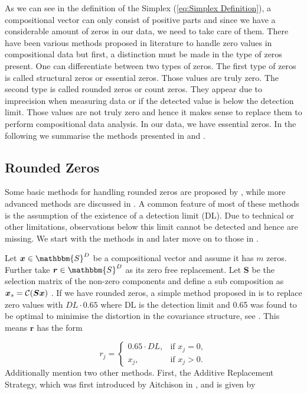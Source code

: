 As we can see in the definition of the Simplex (\ref{eq:Simplex Definition}), a compositional vector can only consist of positive parts and since we have a considerable amount of zeros in our data, we need to take care of them. There have been various methods proposed in literature to handle zero values in compositional data but first, a distinction must be made in the type of zeros present. One can differentiate between two types of zeros. The first type of zeros is called structural zeros or essential zeros. Those values are truly zero. The second type is called rounded zeros or count zeros. They appear due to imprecision when measuring data or if the detected value is below the detection limit. Those values are not truly zero and hence it makes sense to replace them to perform compositional data analysis. In our data, we have essential zeros. In the following we summarise the methods presented in \textcite{Lubbe:2021} and \textcite{Josep:2003}. 

\subsection{Rounded Zeros}
\label{sec:Rounded Zeros}
Some basic methods for handling rounded zeros are proposed by \textcite{Josep:2003}, while more advanced methods are discussed in \textcite{Palarea-Albaladejo:2015}. A common feature of most of these methods is the assumption of the existence of a detection limit (DL). Due to technical or other limitations, observations below this limit cannot be detected and hence are missing. We start with the methods in \textcite{Josep:2003} and later move on to those in \textcite{Palarea-Albaladejo:2015}.

Let $\bm{x} \in \mathbbm{S}^D$ be a compositional vector and assume it has $m$ zeros. Further take $\bm{r} \in \mathbbm{S}^D$ as its zero free replacement. Let $\bm{S}$ be the selection matrix of the non-zero components and define a sub composition as $\bm{x}_s=\mathcal{C}(\bm{Sx})$ . If we have rounded zeros, a simple method proposed in \textcite{Josep:2003} is to replace zero values with $DL \cdot 0.65$ where DL is the detection limit and 0.65 was found to be optimal to minimise the distortion in the covariance structure, see \textcite{Lubbe:2021}. This means $\bm{r}$ has the form

\begin{equation}
r_j = 
\begin{cases}
0.65\cdot DL, & \text{if } x_j=0, \\
x_j, & \text{if } x_j>0.
\end{cases}
\label{eq:DL065}
\end{equation}
%
Additionally \textcite{Josep:2003} mention two other methods. First, the Additive Replacement Strategy, which was first introduced by Aitchison in \textcite{Aitchison:1986}, and is given by


